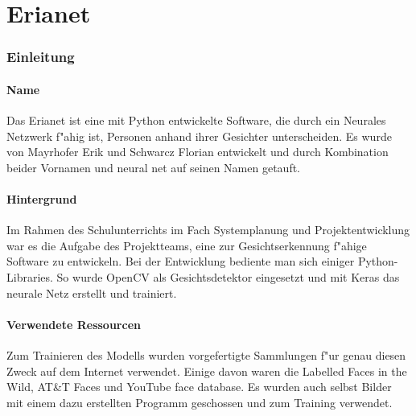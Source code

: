 \documentclass[12pt]{article}
\begin{document}
\ofoot{\pagemark}

\tableofcontents
\newpage

\part{Erianet}
\section{Einleitung}
\subsection{Name}
Das Erianet ist eine mit Python entwickelte Software, die
durch ein Neurales Netzwerk f"ahig ist,
Personen anhand ihrer Gesichter unterscheiden.
Es wurde von Mayrhofer Erik und Schwarcz Florian
entwickelt und durch Kombination beider Vornamen und {\glqq} neural net{\grqq}
auf seinen Namen getauft.
\subsection{Hintergrund}
Im Rahmen des Schulunterrichts im Fach {\glqq} Systemplanung und Projektentwicklung{\grqq}
war es die Aufgabe des Projektteams, eine zur Gesichtserkennung
f"ahige Software zu entwickeln.
Bei der Entwicklung bediente man sich einiger Python-Libraries.
So wurde OpenCV als Gesichtsdetektor eingesetzt und mit Keras das neurale
Netz erstellt und trainiert.
\subsection{Verwendete Ressourcen}
Zum Trainieren des Modells wurden vorgefertigte Sammlungen f"ur genau diesen
Zweck auf dem Internet verwendet. Einige davon waren die {\glqq} Labelled Faces in the Wild{\grqq},
{\glqq} AT\&T Faces{\grqq} und {\glqq} YouTube face database{\grqq}. Es wurden
auch selbst Bilder mit einem dazu erstellten Programm geschossen und zum Training verwendet.
\newpage
\end{document}
